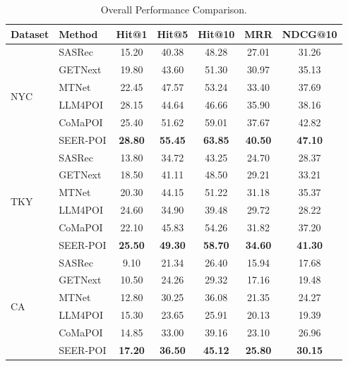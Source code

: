 \documentclass[10pt,twocolumn]{article}
\newcommand{\method}{SEER-POI}
\begin{document}
\begin{table}[t]
\centering
\caption{Overall Performance Comparison.}
\label{tab:overall}
\small
\begin{tabular}{llccccc}
\toprule
Dataset & Method & Hit@1 & Hit@5 & Hit@10 & MRR & NDCG@10 \\
\midrule
\multirow{6}{*}{NYC} & SASRec & 15.20 & 40.38 & 48.28 & 27.01 & 31.26 \\
 & GETNext & 19.80 & 43.60 & 51.30 & 30.97 & 35.13 \\
 & MTNet & 22.45 & 47.57 & 53.24 & 33.40 & 37.69 \\
 & LLM4POI & 28.15 & 44.64 & 46.66 & 35.90 & 38.16 \\
 & CoMaPOI & 25.40 & 51.62 & 59.01 & 37.67 & 42.82 \\
 & \method & \textbf{28.80} & \textbf{55.45} & \textbf{63.85} & \textbf{40.50} & \textbf{47.10} \\
\midrule
\multirow{6}{*}{TKY} & SASRec & 13.80 & 34.72 & 43.25 & 24.70 & 28.37 \\
 & GETNext & 18.50 & 41.11 & 48.50 & 29.21 & 33.21 \\
 & MTNet & 20.30 & 44.15 & 51.22 & 31.18 & 35.37 \\
 & LLM4POI & 24.60 & 34.90 & 39.48 & 29.72 & 28.22 \\
 & CoMaPOI & 22.10 & 45.83 & 54.26 & 31.82 & 37.20 \\
 & \method & \textbf{25.50} & \textbf{49.30} & \textbf{58.70} & \textbf{34.60} & \textbf{41.30} \\
\midrule
\multirow{6}{*}{CA} & SASRec & 9.10 & 21.34 & 26.40 & 15.94 & 17.68 \\
 & GETNext & 10.50 & 24.26 & 29.32 & 17.16 & 19.48 \\
 & MTNet & 12.80 & 30.25 & 36.08 & 21.35 & 24.27 \\
 & LLM4POI & 15.30 & 23.65 & 25.91 & 20.13 & 19.39 \\
 & CoMaPOI & 14.85 & 33.00 & 39.16 & 23.10 & 26.96 \\
 & \method & \textbf{17.20} & \textbf{36.50} & \textbf{45.12} & \textbf{25.80} & \textbf{30.15} \\
\bottomrule
\end{tabular}
\end{table}
\end{document}
